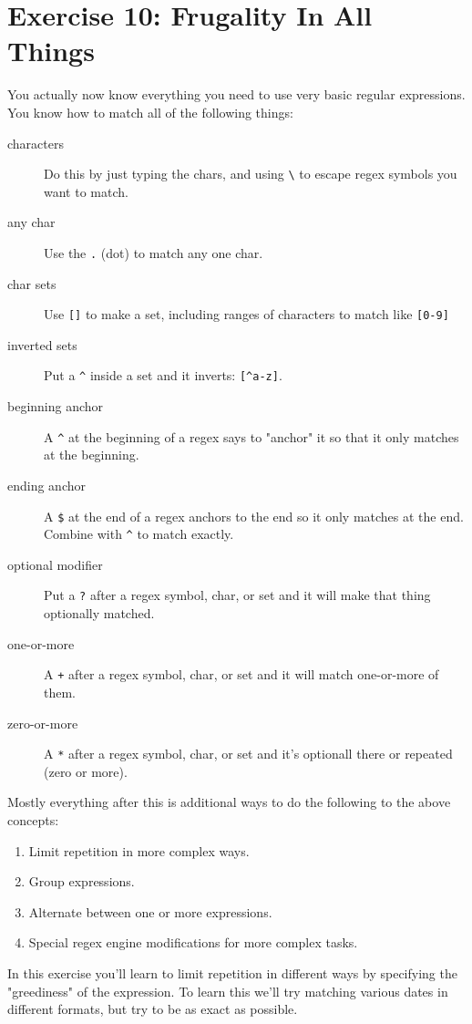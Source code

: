 \chapter{Exercise 10: Frugality In All Things}

You actually now know everything you need to use very basic regular expressions.
You know how to match all of the following things:

\begin{description}
\item[characters] Do this by just typing the chars, and using \verb|\| to escape
    regex symbols you want to match.
\item[any char] Use the \verb|.| (dot) to match any one char.
\item[char sets] Use \verb|[]| to make a set, including ranges of characters
    to match like \verb|[0-9]|
\item[inverted sets] Put a \verb|^| inside a set and it inverts: \verb|[^a-z]|.
\item[beginning anchor] A \verb|^| at the beginning of a regex says to "anchor" it
    so that it only matches at the beginning.
\item[ending anchor] A \verb|$| at the end of a regex anchors to the end so it only
    matches at the end.  Combine with \verb|^| to match exactly.
\item[optional modifier] Put a \verb|?| after a regex symbol, char, or set and it
    will make that thing optionally matched.
\item[one-or-more] A \verb|+| after a regex symbol, char, or set and it will
    match one-or-more of them.
\item[zero-or-more] A \verb|*| after a regex symbol, char, or set and it's optionall
    there or repeated (zero or more).
\end{description}

Mostly everything after this is additional ways to do the following to the above
concepts:

\begin{enumerate}
\item Limit repetition in more complex ways.
\item Group expressions.
\item Alternate between one or more expressions.
\item Special regex engine modifications for more complex tasks.
\end{enumerate}

In this exercise you'll learn to limit repetition in different ways by
specifying the "greediness" of the expression.  To learn this we'll
try matching various dates in different formats, but try to be as exact
as possible.

